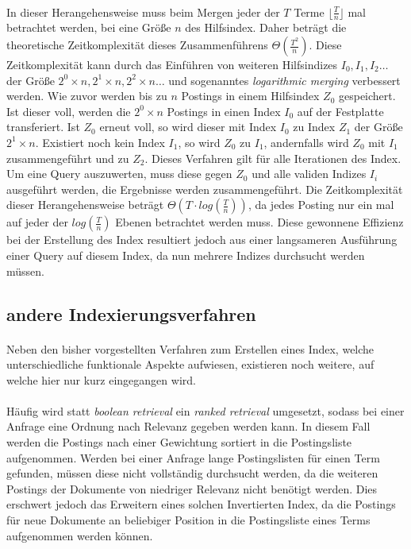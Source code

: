 \paragraph{}
In dieser Herangehensweise muss beim Mergen jeder der  $T$ Terme $ \lfloor \frac{T}{n}\rfloor$ mal betrachtet werden, bei eine Größe $n$ des Hilfsindex. Daher beträgt die theoretische Zeitkomplexität dieses Zusammenführens $\Theta(\frac{T^2}{n})$. Diese Zeitkomplexität kann durch das Einführen von weiteren Hilfsindizes $I_0 , I_1 , I_2  \dots $ der Größe $2^0 \times n, 2^1 \times n, 2^2 \times n\dots$ und sogenanntes \textit{logarithmic merging} verbessert werden. Wie zuvor werden bis zu $n$ Postings in einem Hilfsindex $Z_0$ gespeichert. Ist dieser voll, werden die $2^0 \times n$ Postings in einen Index $I_0$ auf der Festplatte transferiert. Ist $Z_0$ erneut voll, so wird dieser mit Index $I_0$ zu Index $Z_1$ der Größe $2^1 \times n$. Existiert noch kein Index $I_1$, so wird $Z_0$ zu $I_1$, andernfalls wird $Z_0$ mit $I_1$ zusammengeführt und zu $Z_2$. Dieses Verfahren gilt für alle Iterationen des Index. Um eine Query auszuwerten, muss diese gegen $Z_0$ und alle validen Indizes $I_i$ ausgeführt werden, die Ergebnisse werden zusammengeführt. Die Zeitkomplexität dieser Herangehensweise beträgt $\Theta (T \cdot log(\frac{T}{n}))$, da jedes Posting nur ein mal auf jeder der $log(\frac{T}{n})$ Ebenen betrachtet werden muss. Diese gewonnene Effizienz bei der Erstellung des Index resultiert jedoch aus einer langsameren Ausführung einer Query auf diesem Index, da nun mehrere Indizes durchsucht werden müssen.\par

\subsection{andere Indexierungsverfahren}
\paragraph{}
Neben den bisher vorgestellten Verfahren zum Erstellen eines Index, welche unterschiedliche funktionale Aspekte aufwiesen, existieren noch weitere, auf welche hier nur kurz eingegangen wird.\par

\paragraph{}
Häufig wird statt \textit{boolean retrieval} ein \textit{ranked retrieval} umgesetzt, sodass bei einer Anfrage eine Ordnung nach Relevanz gegeben werden kann. In diesem Fall werden die Postings nach einer Gewichtung sortiert in die Postingsliste aufgenommen. Werden bei einer Anfrage lange Postingslisten für einen Term gefunden, müssen diese nicht vollständig durchsucht werden, da die weiteren Postings der Dokumente von niedriger Relevanz nicht benötigt werden. Dies erschwert jedoch das Erweitern eines solchen Invertierten Index, da die Postings für neue Dokumente an beliebiger Position in die Postingsliste eines Terms aufgenommen werden können.\par


